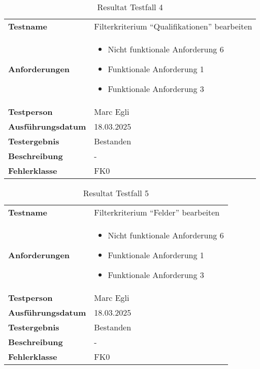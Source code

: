 \begin{table}[H]
    \begin{tabular}{|L{0.3\textwidth}|L{0.65\textwidth}|}
        \hline
           \\[10pt]
        \hline
        \textbf{Testname} & Filterkriterium ``Qualifikationen'' bearbeiten \\
        \hline
        \textbf{Anforderungen} & 
        \begin{itemize}
            \item Nicht funktionale Anforderung 6
            \item Funktionale Anforderung 1
            \item Funktionale Anforderung 3
        \end{itemize} \\
        \hline
        \textbf{Testperson} & Marc Egli \\
        \hline
        \textbf{Ausführungsdatum} & 18.03.2025 \\
        \hline
        \textbf{Testergebnis} & Bestanden \\
        \hline
        \textbf{Beschreibung} & - \\ 
        \hline
        \textbf{Fehlerklasse} & FK0 \\ 
        \hline
    \end{tabular}
    \caption{Resultat Testfall 4}
\end{table}

\begin{table}[H]
    \begin{tabular}{|L{0.3\textwidth}|L{0.65\textwidth}|}
        \hline
           \\[10pt]
        \hline
        \textbf{Testname} & Filterkriterium ``Felder'' bearbeiten \\
        \hline
        \textbf{Anforderungen} & 
        \begin{itemize}
            \item Nicht funktionale Anforderung 6
            \item Funktionale Anforderung 1
            \item Funktionale Anforderung 3
        \end{itemize} \\
        \hline
        \textbf{Testperson} & Marc Egli \\
        \hline
        \textbf{Ausführungsdatum} & 18.03.2025 \\
        \hline
        \textbf{Testergebnis} & Bestanden \\
        \hline
        \textbf{Beschreibung} & - \\ 
        \hline
        \textbf{Fehlerklasse} & FK0 \\ 
        \hline
    \end{tabular}
    \caption{Resultat Testfall 5}
\end{table}

